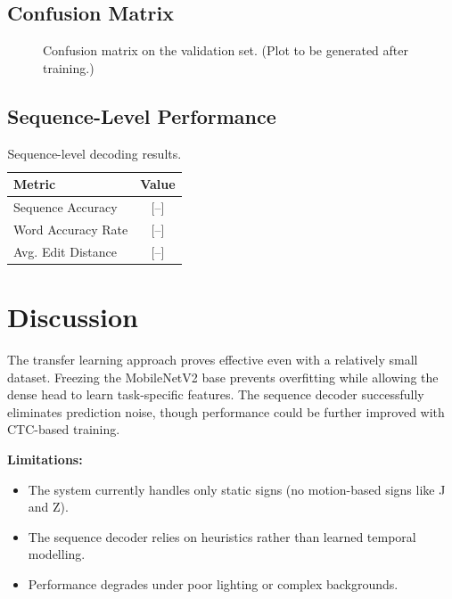 \documentclass[12pt, a4paper]{article}
\begin{document}
\subsection{Confusion Matrix}

\begin{figure}[H]
\centering
\caption{Confusion matrix on the validation set. (Plot to be generated after training.)}
\label{fig:confusion_matrix}
\end{figure}

\subsection{Sequence-Level Performance}

\begin{table}[H]
\centering
\caption{Sequence-level decoding results.}
\begin{tabular}{lc}
\toprule
\textbf{Metric} & \textbf{Value} \\
\midrule
Sequence Accuracy      & [--] \\
Word Accuracy Rate     & [--] \\
Avg. Edit Distance     & [--] \\
\bottomrule
\end{tabular}
\label{tab:seq_metrics}
\end{table}

\section{Discussion}

The transfer learning approach proves effective even with a relatively small dataset. Freezing the MobileNetV2 base prevents overfitting while allowing the dense head to learn task-specific features. The sequence decoder successfully eliminates prediction noise, though performance could be further improved with CTC-based training.

\textbf{Limitations:}
\begin{itemize}
    \item The system currently handles only static signs (no motion-based signs like J and Z).
    \item The sequence decoder relies on heuristics rather than learned temporal modelling.
    \item Performance degrades under poor lighting or complex backgrounds.
\end{itemize}
\end{document}
